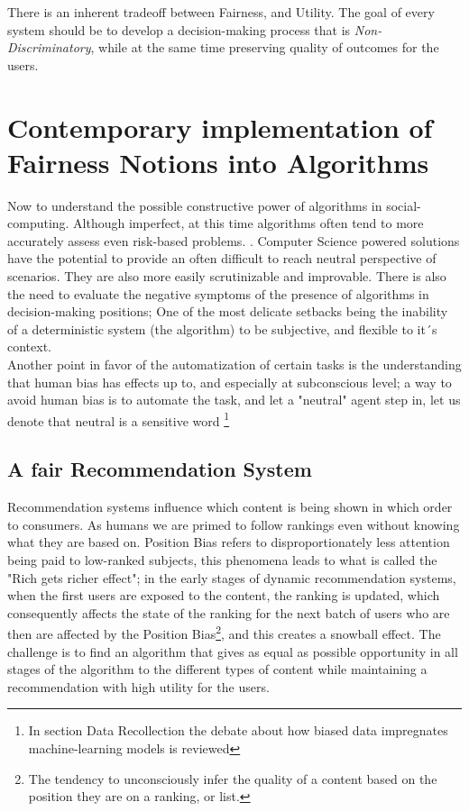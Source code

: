 There is an inherent tradeoff between Fairness, and Utility. The goal of every system should be to develop a decision-making process that is \textsl{Non-Discriminatory}, while at the same time preserving quality of outcomes for the users.

\section{Contemporary implementation of Fairness Notions into Algorithms}
Now to understand the possible constructive power of algorithms in social-computing.
Although imperfect, at this time algorithms often tend to more accurately assess  even risk-based problems. \cite{Meeh13}\cite{GZL*00}\cite{Chou16}. Computer Science powered solutions have the potential to  provide an often difficult to reach neutral perspective of scenarios. They are also more easily scrutinizable and improvable. There is also the need to evaluate the negative symptoms of the presence of algorithms in decision-making positions; One of the most delicate setbacks being the inability of a deterministic system (the algorithm) to be subjective, and flexible to it´s context.\\
Another point in favor of the automatization of certain tasks is the understanding that human bias has effects up to, and especially at subconscious level; a way to avoid human bias is to automate the task, and let a "neutral" agent step in, let us denote that neutral is a sensitive word \footnote{In section Data Recollection the debate about how biased data impregnates machine-learning models is reviewed}
\subsection{A fair Recommendation System}
\label{RecommendationSys}
Recommendation systems influence which content is being shown in which order to consumers. As humans we are primed to follow rankings even without knowing what they are based on. Position Bias refers to disproportionately less attention being paid to low-ranked subjects, this phenomena leads to what is called the "Rich gets richer effect"; in the early stages of dynamic recommendation systems, when the first users are exposed to the content, the ranking is updated, which consequently affects the state of the ranking for the next batch of users who are then are affected by the Position Bias\footnote{The tendency to unconsciously infer the quality of a content based on the position they are on a ranking, or list.}, and this creates a snowball effect. The challenge is to find an algorithm that gives as equal as possible opportunity in all stages of the algorithm to the different types of content while maintaining a recommendation with high utility for the users.
